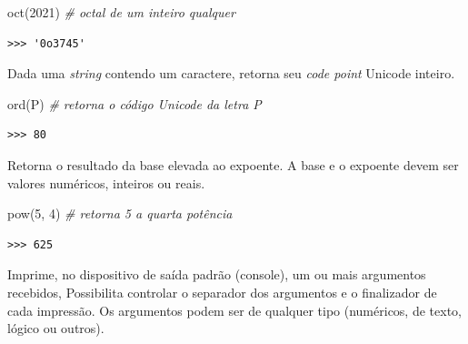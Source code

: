 \documentclass[
]{book}
\newenvironment{Shaded}{\begin{snugshade}}{\end{snugshade}}
\newcommand{\BuiltInTok}[1]{#1}
\newcommand{\CommentTok}[1]{\textcolor[rgb]{0.56,0.35,0.01}{\textit{#1}}}
\newcommand{\DecValTok}[1]{\textcolor[rgb]{0.00,0.00,0.81}{#1}}
\newcommand{\NormalTok}[1]{#1}
\newcommand{\StringTok}[1]{\textcolor[rgb]{0.31,0.60,0.02}{#1}}
\providecommand{\tightlist}{%
  \setlength{\itemsep}{0pt}\setlength{\parskip}{0pt}}
\begin{document}
\begin{Shaded}
\begin{Highlighting}[]
\BuiltInTok{oct}\NormalTok{(}\DecValTok{2021}\NormalTok{) }\CommentTok{\# octal de um inteiro qualquer}
\end{Highlighting}
\end{Shaded}

\begin{verbatim}
>>> '0o3745'
\end{verbatim}

\begin{description}
\tightlist
\item[\texttt{ord(c)}]
Dada uma \emph{string} contendo um caractere, retorna seu \emph{code point} Unicode inteiro.
\end{description}

\begin{Shaded}
\begin{Highlighting}[]
\BuiltInTok{ord}\NormalTok{(}\StringTok{\textquotesingle{}P\textquotesingle{}}\NormalTok{) }\CommentTok{\# retorna o código Unicode da letra P}
\end{Highlighting}
\end{Shaded}

\begin{verbatim}
>>> 80
\end{verbatim}

\begin{description}
\tightlist
\item[\texttt{pow(base,\ exp)}]
Retorna o resultado da base elevada ao expoente. A base e o expoente devem ser valores numéricos, inteiros ou reais.
\end{description}

\begin{Shaded}
\begin{Highlighting}[]
\BuiltInTok{pow}\NormalTok{(}\DecValTok{5}\NormalTok{, }\DecValTok{4}\NormalTok{) }\CommentTok{\# retorna 5 a quarta potência}
\end{Highlighting}
\end{Shaded}

\begin{verbatim}
>>> 625
\end{verbatim}

\begin{description}
\tightlist
\item[\texttt{print(*argumento)}]
Imprime, no dispositivo de saída padrão (console), um ou mais argumentos recebidos, Possibilita controlar o separador dos argumentos e o finalizador de cada impressão. Os argumentos podem ser de qualquer tipo (numéricos, de texto, lógico ou outros).
\end{description}
\end{document}
